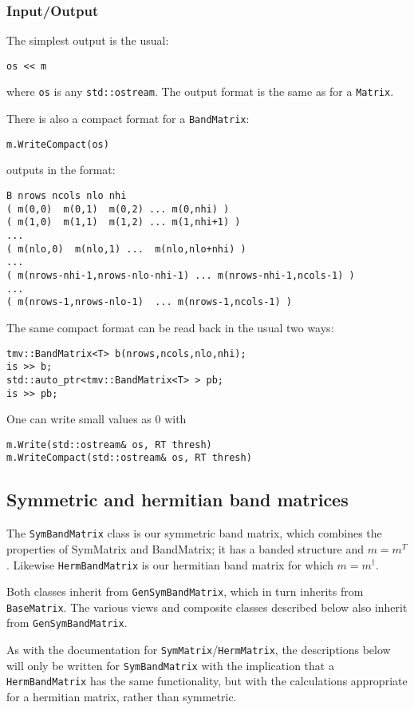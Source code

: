 \documentclass[twoside,letterpaper,11pt]{article}
\renewcommand{\tt}[1]{{\texttt {#1}}}
\begin{document}
\subsubsection{Input/Output}

The simplest output is the usual:
\begin{verbatim}
os << m
\end{verbatim}
where \tt{os} is any \tt{std::ostream}.
The output format is the same as for a \tt{Matrix}.

There is also a compact format for a \tt{BandMatrix}:
\begin{verbatim}
m.WriteCompact(os)
\end{verbatim}
outputs in the format:
\begin{verbatim}
B nrows ncols nlo nhi
( m(0,0)  m(0,1)  m(0,2) ... m(0,nhi) )
( m(1,0)  m(1,1)  m(1,2) ... m(1,nhi+1) )
...
( m(nlo,0)  m(nlo,1) ...  m(nlo,nlo+nhi) )
...
( m(nrows-nhi-1,nrows-nlo-nhi-1) ... m(nrows-nhi-1,ncols-1) )
...
( m(nrows-1,nrows-nlo-1)  ... m(nrows-1,ncols-1) )
\end{verbatim}

The same compact format can be read back in the usual two ways:
\begin{verbatim}
tmv::BandMatrix<T> b(nrows,ncols,nlo,nhi);
is >> b;
std::auto_ptr<tmv::BandMatrix<T> > pb;
is >> pb;
\end{verbatim}

One can write small values as 0 with
\begin{verbatim}
m.Write(std::ostream& os, RT thresh)
m.WriteCompact(std::ostream& os, RT thresh)
\end{verbatim}

\subsection{Symmetric and hermitian band matrices}

The \tt{SymBandMatrix} class is our symmetric band matrix, which combines
the properties of SymMatrix and BandMatrix; it has a banded structure and
$m = m^T$.  Likewise \tt{HermBandMatrix} is our hermitian band matrix for
which $m = m^\dagger$.

Both classes inherit from \tt{GenSymBandMatrix}, which in turn inherits from 
\tt{BaseMatrix}.  The various views and composite classes described below 
also inherit from \tt{GenSymBandMatrix}.

As with the documentation for \tt{SymMatrix}/\tt{HermMatrix}, the descriptions
below will only be written for \tt{SymBandMatrix} with the implication
that a \tt{HermBandMatrix} has the same functionality, but with the calculations
appropriate for a hermitian matrix, rather than symmetric.
\end{document}
